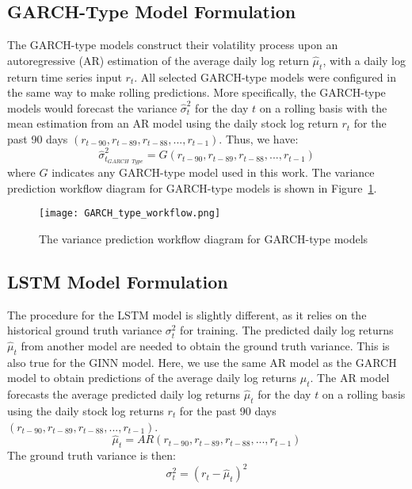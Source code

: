 \subsection{GARCH-Type Model Formulation}
The GARCH-type models construct their volatility process upon an autoregressive (AR) estimation of the average daily log return $\hat{\mu}_t$, with a daily log return time series input $r_t$. All selected GARCH-type models were configured in the same way to make rolling predictions. More specifically, the GARCH-type models would forecast the variance $\hat{\sigma}_t^2$ for the day $t$ on a rolling basis with the mean estimation from an AR model using the daily stock log return $r_t$ for the past 90 days $(r_{t-90},r_{t-89},r_{t-88},...,r_{t-1})$. Thus, we have:
\begin{equation}
    \hat{\sigma}_{t_{GARCH \enspace Type}}^2 = G (r_{t-90},r_{t-89},r_{t-88},...,r_{t-1}) 
\end{equation}
where $G$ indicates any GARCH-type model used in this work. The variance prediction workflow diagram for GARCH-type models is shown in Figure~\ref{GARCHWF}.

\begin{figure}[h]
  \centering
  \texttt{[image: GARCH\_type\_workflow.png]}
  \caption{The variance prediction workflow diagram for GARCH-type models}
  \label{GARCHWF}
\end{figure}

\subsection{LSTM Model Formulation}
\label{LSTMsection}
The procedure for the LSTM model is slightly different, as it relies on the historical ground truth variance $\sigma_t^2$ for training. The predicted daily log returns $\hat{\mu}_t$ from another model are needed to obtain the ground truth variance. This is also true for the GINN model. Here, we use the same AR model as the GARCH model to obtain predictions of the average daily log returns $\hat{\mu}_t$. The AR model forecasts the average predicted daily log returns $\hat{\mu}_t$ for the day $t$ on a rolling basis using the daily stock log returns $r_t$ for the past 90 days $(r_{t-90},r_{t-89},r_{t-88},...,r_{t-1})$. 
\begin{equation}
    \hat{\mu}_t = AR (r_{t-90},r_{t-89},r_{t-88},...,r_{t-1}) 
\end{equation}
The ground truth variance is then: 
\begin{equation}
    \sigma_t^2 = \left( r_t - \hat{\mu}_t \right) ^2
\end{equation}

